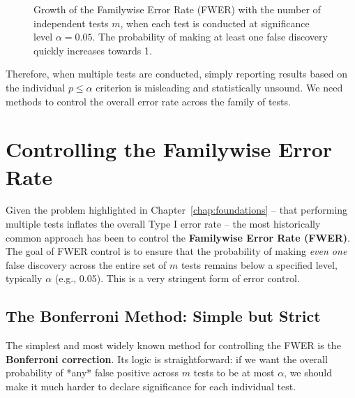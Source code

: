 \documentclass[12pt]{book}
\newcommand{\FWER}{{FWER}}  %
\begin{document}
\begin{figure}[ht]
  \centering
  \caption[Growth of FWER with number of tests]{Growth of the Familywise Error Rate (\FWER) with the number of independent tests $m$, when each test is conducted at significance level $\alpha=0.05$. The probability of making at least one false discovery quickly increases towards 1.}
  \label{fig:fwer_growth}
\end{figure}

Therefore, when multiple tests are conducted, simply reporting results based on the individual $p \le \alpha$ criterion is misleading and statistically unsound. We need methods to control the overall error rate across the family of tests.

\chapter{Controlling the Familywise Error Rate}
\label{chap:fwer_control}

Given the problem highlighted in Chapter~\ref{chap:foundations} – that performing multiple tests inflates the overall Type I error rate – the most historically common approach has been to control the \textbf{Familywise Error Rate (FWER)}. The goal of FWER control is to ensure that the probability of making \emph{even one} false discovery across the entire set of $m$ tests remains below a specified level, typically $\alpha$ (e.g., 0.05). This is a very stringent form of error control.

\section{The Bonferroni Method: Simple but Strict}
The simplest and most widely known method for controlling the FWER is the \textbf{Bonferroni correction}. Its logic is straightforward: if we want the overall probability of *any* false positive across $m$ tests to be at most $\alpha$, we should make it much harder to declare significance for each individual test.
\end{document}
